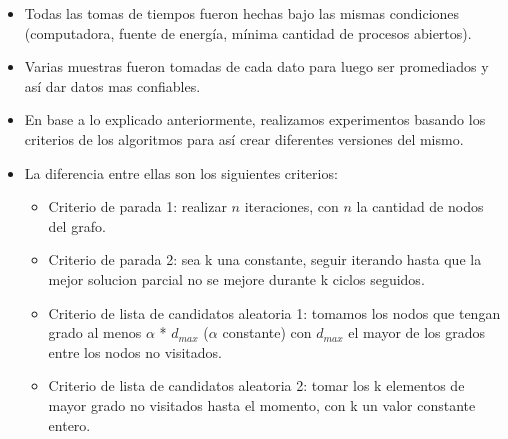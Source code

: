\begin{itemize}
    \item Todas las tomas de tiempos fueron hechas bajo las mismas condiciones (computadora, fuente de energía, mínima cantidad de procesos abiertos).
    \item Varias muestras fueron tomadas de cada dato para luego ser promediados y así dar datos mas confiables.
    \item En base a lo explicado anteriormente, realizamos experimentos basando los criterios de los algoritmos para así crear diferentes versiones del mismo.
    \item La diferencia entre ellas son los siguientes criterios:
    \begin{itemize}
        \item Criterio de parada 1: realizar $n$ iteraciones, con $n$ la cantidad de nodos del grafo.
        \item Criterio de parada 2: sea k una constante, seguir iterando hasta que la mejor solucion parcial no se mejore durante k ciclos seguidos.

        \item Criterio de lista de candidatos aleatoria 1: tomamos los nodos que tengan grado al menos $\alpha$ * $d_{max}$ ($\alpha$ constante) con $d_{max}$ el mayor de los grados entre los nodos no visitados.
        \item Criterio de lista de candidatos aleatoria 2: tomar los k elementos de mayor grado no visitados hasta el momento, con k un valor constante entero.


\end{itemize}
\end{itemize}
